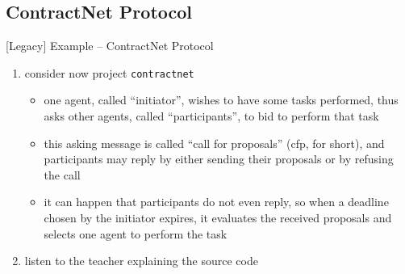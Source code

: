 \documentclass[presentation]{beamer}\mode<presentation>{\usetheme{AMSBolognaFC}}
\begin{document}
\subsection{ContractNet Protocol}

\begin{frame}[c]{[Legacy] Example -- ContractNet Protocol}
    \begin{enumerate}
        \item consider now project \alert{\texttt{contractnet}}
        \begin{itemize}
            \item one agent, called ``initiator'', wishes to have some tasks performed, thus asks other agents, called ``participants'', to bid to perform that task
            \item this asking message is called ``call for proposals'' (cfp, for short), and participants may reply by either sending their proposals or by refusing the call
            \item it can happen that participants do not even reply, so when a deadline chosen by the initiator expires, it evaluates the received proposals and selects one agent to perform the task
        \end{itemize}
        
        \vfill
        
        \item listen to the teacher explaining the source code
    \end{enumerate}
\end{frame} 
\end{document}
